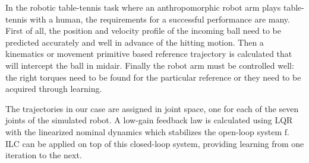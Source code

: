 \documentclass[10pt,a4paper]{article}
\theoremstyle{plain}
\theoremstyle{definition}
\newcommand{\boldvec}[1]{\boldsymbol{\mathrm{#1}}}
\let\vec\boldvec
\newcommand{\dynamics}{\vec{f}}
\begin{document}
In the robotic table-tennis task where an anthropomorphic robot arm plays table-tennis with a human, the requirements for a successful performance are many. First of all, the position and velocity profile of the incoming ball need to be predicted accurately and well in advance of the hitting motion. Then a kinematics or movement primitive based reference trajectory is calculated that will intercept the ball in midair. Finally the robot arm must be controlled well: the right torques need to be found for the particular reference or they need to be acquired through learning.

The trajectories in our case are assigned in joint space, one for each of the seven joints of the simulated robot. A low-gain feedback law is calculated using LQR with the linearized nominal dynamics which stabilizes the open-loop system $\dynamics$. ILC can be applied on top of this closed-loop system, providing learning from one iteration to the next. 
\end{document}
